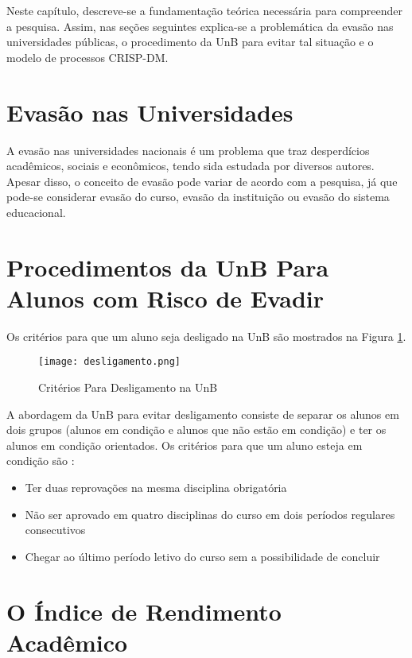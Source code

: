 Neste capítulo, descreve-se a fundamentação teórica necessária para compreender a
pesquisa. Assim, nas seções seguintes explica-se a problemática da evasão nas universidades
públicas, o procedimento da UnB para evitar tal situação e o modelo de processos
CRISP-DM. 

\section{Evasão nas Universidades} 
A evasão nas universidades nacionais é um problema que traz desperdícios acadêmicos,
sociais e econômicos, tendo sida estudada por diversos autores. Apesar disso, o
conceito de evasão pode variar \cite{mec_conceito_evasao} de acordo com a pesquisa,
já que pode-se considerar evasão do curso, evasão da instituição ou evasão do
sistema educacional. 

\section{Procedimentos da UnB Para Alunos com Risco de Evadir}
\par Os critérios para que um aluno seja desligado na UnB são mostrados na Figura
\ref{desligamento}. 
\begin{figure}[!ht]
    \caption{Critérios Para Desligamento na UnB}
    \centering
    \texttt{[image: desligamento.png]}
    \label{desligamento}
\end{figure}
 
A abordagem da UnB para evitar desligamento consiste de separar os alunos em dois
grupos (alunos em condição e alunos que não estão em condição) e ter os alunos em
condição orientados. Os critérios para que um aluno esteja em condição são
\cite{manual_calouro}: 
\begin{itemize}
    \item Ter duas reprovações na mesma disciplina obrigatória
    \item Não ser aprovado em quatro disciplinas do curso em dois períodos regulares
        consecutivos
    \item Chegar ao último período letivo do curso sem a possibilidade de concluir
\end{itemize}

\section{O Índice de Rendimento Acadêmico}


